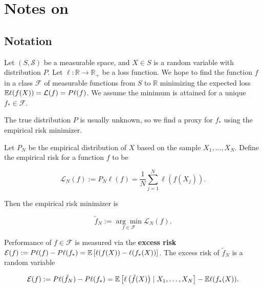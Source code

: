 \section{Notes on \citet{Mathieu2019}}

\subsection{Notation}

Let \((S, \mathcal{S})\) be a measurable space, and \(X \in S\) is a random variable with distribution \(P\). Let \(\ell: \mathbb{R} \to \mathbb{R}_+\) be a loss function. We hope to find the function \(f\) in a class \(\mathcal{F}\) of measurable functions from \(S\) to \(\mathbb{R}\) minimizing the expected loss \(\mathbb{E} \ell(f(X)) = \mathcal{L}(f)= P \ell(f)\). We assume the minimum is attained for a unique \(f_* \in \mathcal{F}\).

The true distribution \(P\) is usually unknown, so we find a proxy for \(f_*\) using the empirical risk minimizer. 

\begin{definition}

Let \(P_N\) be the empirical distribution of \(X\) based on the sample \(X_1, \ldots, X_N\). Define the empirical risk for a function \(f\) to be

\[
\mathcal{L}_N(f) := P_N \ell(f) = \frac{1}{N} \sum_{j=1}^N \ell(f(X_j)).
\]

Then the empirical risk minimizer is 

\begin{equation}\label{statlearning.emp.risk.min}
\tilde{f}_N := \underset{f \in \mathcal{F}}{\arg \min}\mathcal{L}_N(f).
\end{equation}

Performance of \(f \in \mathcal{F}\) is measured via the \textbf{excess risk} \(\mathcal{E}(f) := P \ell(f) - P\ell(f_*) = \mathbb{E} \left[ \ell(f(X)) - \ell(f_*(X)) \right]\). The excess risk of \(\tilde{f}_N\) is a random variable

\[
\mathcal{E}(f) := P \ell(\tilde{f}_N) - P\ell(f_*) = \mathbb{E} \left[ \ell \left(\tilde{f}(X) \right) \mid X_1, \ldots, X_N \right] - \mathbb{E} \ell(f_*(X)).
\]

\end{definition}

